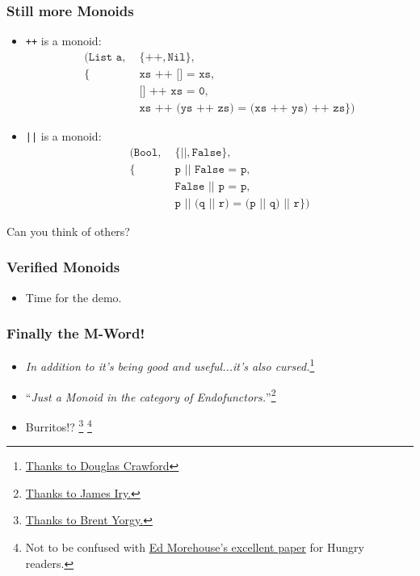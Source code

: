 \documentclass[hyperref={colorlinks = true,linkcolor = blue, citecolor = blue, urlcolor = blue}]{beamer}
\begin{document}
\begin{frame}[fragile]
  \frametitle{Still more Monoids}
  \begin{itemize}
    \item \texttt{++} is a monoid: \begin{align*}
                                (\texttt{List a},
                                 \;&\{\texttt{++},
                                      \texttt{Nil}\}, \\
    \{&\texttt{xs ++ [] = xs}, \\
    &\texttt{[] ++ xs = 0}, \\
    &\texttt{xs ++ (ys ++ zs) = (xs ++ ys) ++ zs} \})
                                 \end{align*}
    \item \texttt{||} is a monoid: \begin{align*}
                                (\texttt{Bool},
                                 \;&\{\texttt{||},
                                      \texttt{False}\}, \\
    \{&\texttt{p || False = p}, \\
    &\texttt{False || p = p}, \\
    &\texttt{p || (q || r) = (p || q) || r} \})
                                 \end{align*}
  \end{itemize}
  Can you think of others?
\end{frame}

\begin{frame}[fragile]
  \frametitle{Verified Monoids}
  \begin{itemize}
    \item Time for the demo.
  \end{itemize}
\end{frame}

\begin{frame}[fragile]
  \frametitle{Finally the M-Word!}
  \begin{itemize}
    \item \textit{In addition to it's being good and useful...it's also cursed.}\footnote{\href{https://www.youtube.com/watch?v=dkZFtimgAcM&t=36s}{Thanks to Douglas Crawford}}
    \item ``\textit{Just a Monoid in the category of Endofunctors.}''\footnote{
      \href{http://james-iry.blogspot.com/2009/05/brief-incomplete-and-mostly-wrong.html}
           {Thanks to James Iry.}}
    \item Burritos!?
      \footnote{
        \href{https://byorgey.wordpress.com/2009/01/12/abstraction-intuition-and-the-monad-tutorial-fallacy/}
             {Thanks to Brent Yorgy.}}
             \footnote{Not to be confused with \href{https://emorehouse.wescreates.wesleyan.edu/silliness/burrito_monads.pdf}{Ed Morehouse's excellent paper} for Hungry readers.}
  \end{itemize}
\end{frame}
\end{document}
